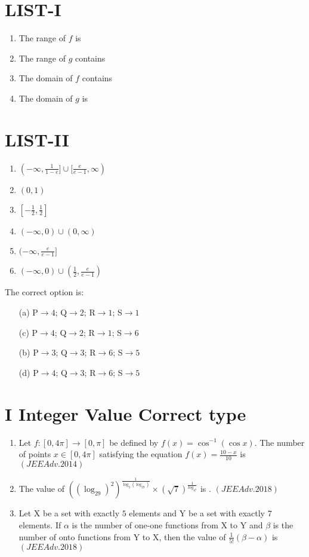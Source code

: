 \documentclass[journal,12pt,twocolumn]{IEEEtran}
\theoremstyle{remark}
\begin{document}
\begin{multicols}{2}
	\section{LIST-I}
	\begin{enumerate}[label=\Alph*, start=16]
	\item The range of $f$ is
	\item The range of $g$ contains
	\item The domain of $f$ contains
	\item The domain of $g$ is 
\end{enumerate}
\columnbreak
	\section{LIST-II}
\begin{enumerate}
	\item $(-\infty,\frac{1}{1-e}]\cup[\frac{e}{e-1},\infty)$
	\item $(0,1)$
	\item $[-\frac{1}{2},\frac{1}{2}]$
	\item $(-\infty,0)\cup(0,\infty)$
	\item $(-\infty,\frac{e}{e-1}]$
	\item $(-\infty,0)\cup(\frac{1}{2},\frac{e}{e-1})$
\end{enumerate}
\end{multicols}
The correct option is:
\begin{multicols}{2}
	\begin{enumerate}
		\item[(a)] P$\to4$; Q$\to2$; R$\to1$; S$\to1$
		\item[(c)] P$\to4$; Q$\to2$; R$\to1$; S$\to6$
	\end{enumerate}
	\columnbreak
	\begin{enumerate}
		\item[(b)] P$\to3$; Q$\to3$; R$\to6$; S$\to5$
		\item[(d)] P$\to4$; Q$\to3$; R$\to6$; S$\to5$
	\end{enumerate}
\end{multicols}
\twocolumn
	    \section*{I Integer Value Correct type}
		   \begin{enumerate}
			   \item Let $f:[0,4\pi]\to[0,\pi]$ be defined by $f(x)=\cos^{-1}(\cos x)$. The number of points $x\in[0,4\pi]$ satisfying the equation ${f(x)=\frac{10-x}{10}}$ is \hfill${(JEE Adv.2014)}$
			   \item The  value  of  $((\log_29)^2)^{\frac{1}{\log_2(\log_29)}}\times (\sqrt7)^{\frac{1}{log_47}}$  is .
				   \hfill${(JEEAdv.2018)}$
			   \item Let X be a set with exactly $5$ elements and Y be a set with exactly $7$ elements. If $\alpha$ is the number of one-one functions from X to Y and $\beta$ is the number of onto functions from Y to X, then the value of $\frac{1}{5!}(\beta-\alpha)$ is ${(JEEAdv.2018)}$
		   \end{enumerate}
\end{document}
